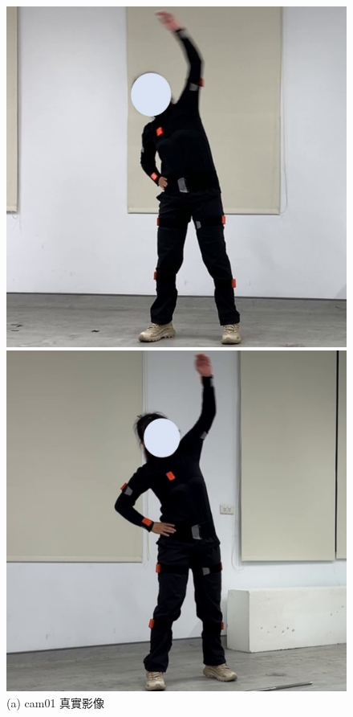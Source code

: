 \begin{figure}[!ht]
   \centering
   \begin{minipage}{.5\textwidth}
      \centering
      \includegraphics[width=.95\linewidth]{figure/ch4_fig_warm_cam01_with1.jpg}
      \caption*{(a) cam01 真實影像}
    \end{minipage}%
    \begin{minipage}{.5\textwidth}
       \centering
       \includegraphics[width=.95\linewidth]{figure/ch4_fig_warm_cam02_with1.jpg}

\end{minipage}
\end{figure}
